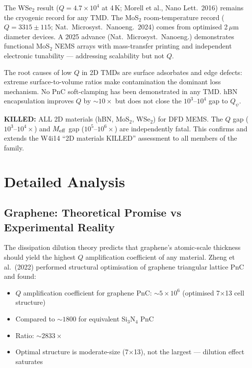 \documentclass[11pt]{article}
\theoremstyle{definition}
\theoremstyle{remark}
\newcommand{\ee}[1]{\times 10^{#1}}
\newcommand{\Meff}{M_{\rm eff}}
\newcommand{\Qpsi}{Q_\psi}
\newcommand{\killed}[1]{\textcolor{red!70!black}{\textbf{KILLED:} #1}}
\begin{document}
\begin{tcolorbox}[colback=blue!5!white, colframe=blue!50!black,
  title=\textbf{W4i16 TOP 5 FINDINGS --- Ranked by Programme Impact}]
\begin{enumerate}
The WSe$_2$ result ($Q = 4.7\ee{4}$ at 4\,K; Morell et al., Nano
Lett.\ 2016) remains the cryogenic record for any TMD. The MoS$_2$
room-temperature record ($Q = 3315 \pm 115$; Nat.\ Microsyst.\
Nanoeng.\ 2024) comes from optimised 2\,$\mu$m diameter devices.
A 2025 advance (Nat.\ Microsyst.\ Nanoeng.) demonstrates functional
MoS$_2$ NEMS arrays with mass-transfer printing and independent
electronic tunability --- addressing scalability but not $Q$.

The root causes of low $Q$ in 2D TMDs are surface adsorbates and
edge defects: extreme surface-to-volume ratios make contamination
the dominant loss mechanism. No PnC soft-clamping has been demonstrated
in any TMD. hBN encapsulation improves $Q$ by $\sim 10\times$ but
does not close the $10^3$--$10^4$ gap to $\Qpsi$.

\killed{ALL 2D materials (hBN, MoS$_2$, WSe$_2$) for DFD MEMS. The
$Q$ gap ($10^3$--$10^4\times$) and $\Meff$ gap ($10^5$--$10^6\times$)
are independently fatal. This confirms and extends the W4i14 ``2D
materials KILLED'' assessment to all members of the family.}

\end{enumerate}
\end{tcolorbox}


\section{Detailed Analysis}
\label{sec:detailed}

\subsection{Graphene: Theoretical Promise vs Experimental Reality}

The dissipation dilution theory predicts that graphene's atomic-scale
thickness should yield the highest $Q$ amplification coefficient of any
material. Zheng et al.\ (2022) performed structural optimisation of
graphene triangular lattice PnC and found:
\begin{itemize}[nosep]
\item $Q$ amplification coefficient for graphene PnC: $\sim 5\ee{6}$
  (optimised 7$\times$13 cell structure)
\item Compared to $\sim 1800$ for equivalent Si$_3$N$_4$ PnC
\item Ratio: $\sim 2833\times$
\item Optimal structure is moderate-size (7$\times$13), not the largest
  --- dilution effect saturates
\end{itemize}
\end{document}
